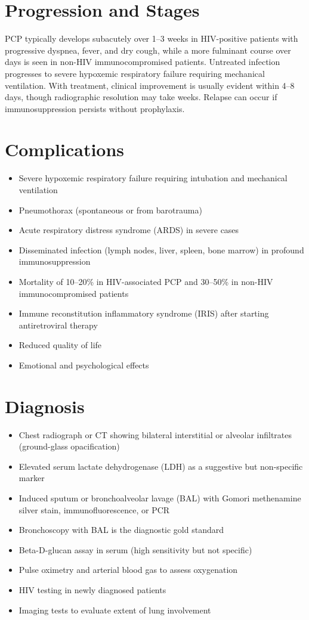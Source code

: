 \section{Progression and Stages}
PCP typically develops subacutely over 1--3 weeks in HIV-positive patients with progressive dyspnea, fever, and dry cough, while a more fulminant course over days is seen in non-HIV immunocompromised patients. Untreated infection progresses to severe hypoxemic respiratory failure requiring mechanical ventilation. With treatment, clinical improvement is usually evident within 4--8 days, though radiographic resolution may take weeks. Relapse can occur if immunosuppression persists without prophylaxis.

\section{Complications}

\begin{itemize}[noitemsep]
  \item Severe hypoxemic respiratory failure requiring intubation and mechanical ventilation
  \item Pneumothorax (spontaneous or from barotrauma)
  \item Acute respiratory distress syndrome (ARDS) in severe cases
  \item Disseminated infection (lymph nodes, liver, spleen, bone marrow) in profound immunosuppression
  \item Mortality of 10--20\% in HIV-associated PCP and 30--50\% in non-HIV immunocompromised patients
  \item Immune reconstitution inflammatory syndrome (IRIS) after starting antiretroviral therapy
  \item Reduced quality of life
  \item Emotional and psychological effects
\end{itemize}

\section{Diagnosis}

\begin{itemize}[noitemsep]
  \item Chest radiograph or CT showing bilateral interstitial or alveolar infiltrates (ground-glass opacification)
  \item Elevated serum lactate dehydrogenase (LDH) as a suggestive but non-specific marker
  \item Induced sputum or bronchoalveolar lavage (BAL) with Gomori methenamine silver stain, immunofluorescence, or PCR
  \item Bronchoscopy with BAL is the diagnostic gold standard
  \item Beta-D-glucan assay in serum (high sensitivity but not specific)
  \item Pulse oximetry and arterial blood gas to assess oxygenation
  \item HIV testing in newly diagnosed patients
  \item Imaging tests to evaluate extent of lung involvement
\end{itemize}

